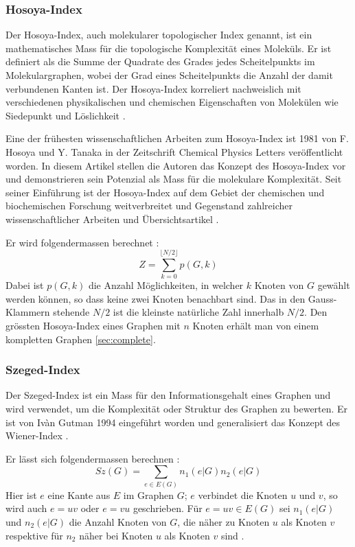 \subsubsection{Hosoya-Index} \label{sec:hosoya_index}

Der Hosoya-Index, auch molekularer topologischer Index genannt, ist ein mathematisches Mass für die topologische Komplexität eines Moleküls.
Er ist definiert als die Summe der Quadrate des Grades jedes Scheitelpunkts im Molekulargraphen, wobei der Grad eines Scheitelpunkts die Anzahl der damit verbundenen Kanten ist.
Der Hosoya-Index korreliert nachweislich mit verschiedenen physikalischen und chemischen Eigenschaften von Molekülen wie Siedepunkt und Löslichkeit \cite[p.~397ff]{hosoya_topological_1972}.

Eine der frühesten wissenschaftlichen Arbeiten zum Hosoya-Index ist 1981 von F. Hosoya und Y. Tanaka in der Zeitschrift Chemical Physics Letters veröffentlicht worden.
In diesem Artikel stellen die Autoren das Konzept des Hosoya-Index vor und demonstrieren sein Potenzial als Mass für die molekulare Komplexität.
Seit seiner Einführung ist der Hosoya-Index auf dem Gebiet der chemischen und biochemischen Forschung weitverbreitet und Gegenstand zahlreicher wissenschaftlicher Arbeiten und Übersichtsartikel \cite[p.~397ff]{hosoya_topological_1972}.

Er wird folgendermassen berechnet \cite[p.~182]{hosoya_topological_1972}:
\begin{equation}
    Z = \sum_{k = 0}^{\lfloor N / 2 \rfloor} p(G, k)
\end{equation}
Dabei ist $ p(G, k) $ die Anzahl Möglichkeiten, in welcher $ k $ Knoten von $ G $ gewählt werden können, so dass keine zwei Knoten benachbart sind.
Das in den Gauss-Klammern stehende $ N / 2 $ ist die kleinste natürliche Zahl innerhalb $ N / 2 $.
Den grössten Hosoya-Index eines Graphen mit $ n $ Knoten erhält man von einem kompletten Graphen \ref{sec:complete}.

\subsubsection{Szeged-Index}

Der Szeged-Index ist ein Mass für den Informationsgehalt eines Graphen und wird verwendet, um die Komplexität oder Struktur des Graphen zu bewerten.
Er ist von Ivàn Gutman 1994 eingeführt worden und generalisiert das Konzept des Wiener-Index \cite{gutman_szeged_1998}.

Er lässt sich folgendermassen berechnen \cite[p.~2]{gutman_szeged_1998}:
\begin{equation}
    Sz(G) = \sum_{e \in E(G)} n_1(e | G)n_2 (e | G)
\end{equation}
Hier ist $ e $ eine Kante aus $ E $ im Graphen $ G $; $ e $ verbindet die Knoten $ u $ und $ v $, so wird auch $ e = uv $ oder $ e = vu $ geschrieben.
Für $ e = uv \in E(G) $ sei $ n_1(e | G) $ und $ n_2(e | G) $ die Anzahl Knoten von $G$, die näher zu Knoten $ u $ als Knoten $ v $ respektive für $n_2$ näher bei Knoten $ u $ als Knoten $ v $ sind \cite{gutman_szeged_1998}.

